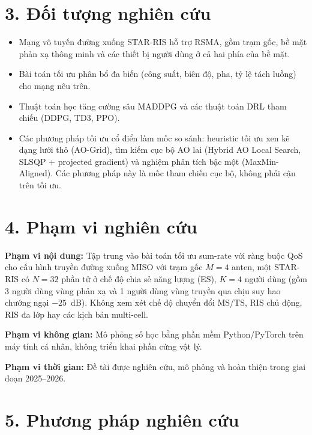 \section*{3. Đối tượng nghiên cứu}

\begin{itemize}[leftmargin=*]
\item Mạng vô tuyến đường xuống STAR-RIS hỗ trợ RSMA, gồm trạm gốc, bề mặt
phản xạ thông minh và các thiết bị người dùng ở cả hai phía của bề mặt.
\item Bài toán tối ưu phân bổ đa biến (công suất, biên độ, pha, tỷ lệ tách
luồng) cho mạng nêu trên.
\item Thuật toán học tăng cường sâu MADDPG và các thuật toán DRL tham
chiếu (DDPG, TD3, PPO).
\item Các phương pháp tối ưu cổ điển làm mốc so sánh: heuristic tối ưu xen
kẽ dạng lưới thô (AO-Grid), tìm kiếm cục bộ AO lai (Hybrid AO Local
Search, SLSQP + projected gradient) và nghiệm phân tích bậc một
(MaxMin-Aligned). Các phương pháp này là mốc tham chiếu cục bộ, không
phải cận trên tối ưu.
\end{itemize}

\section*{4. Phạm vi nghiên cứu}

\noindent\textbf{Phạm vi nội dung:} Tập trung vào bài toán tối ưu sum-rate
với ràng buộc QoS cho cấu hình truyền đường xuống MISO với trạm gốc
$M=4$ anten, một STAR-RIS có $N=32$ phần tử ở chế độ chia sẻ năng lượng
(ES), $K=4$ người dùng (gồm 3 người dùng vùng phản xạ và 1 người dùng
vùng truyền qua chịu suy hao chướng ngại $-25$~dB). Không xem xét chế độ
chuyển đổi MS/TS, RIS chủ động, RIS đa lớp hay các kịch bản multi-cell.

\noindent\textbf{Phạm vi không gian:} Mô phỏng số học bằng phần mềm
Python/PyTorch trên máy tính cá nhân, không triển khai phần cứng vật lý.

\noindent\textbf{Phạm vi thời gian:} Đề tài được nghiên cứu, mô phỏng và
hoàn thiện trong giai đoạn 2025--2026.

\section*{5. Phương pháp nghiên cứu}

